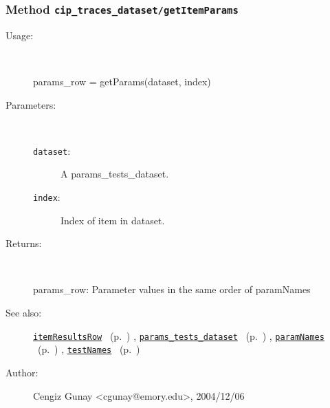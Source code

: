 \subsubsection[Method \texttt{getItemParams}]{Method \texttt{cip\_traces\_dataset/getItemParams}}%
%
\label{ref_cip_traces_dataset__getItemParams}%
\hypertarget{ref_cip_traces_dataset__getItemParams}{}%
\begin{description}
%
\item[Usage:]~%
\begin{lyxcode}%
params\_row = getParams(dataset, index)
%
\end{lyxcode}%
%
%
\item[Parameters:]~
\begin{description}%
\item[\texttt{dataset}:]
 A params\_tests\_dataset.
\item[\texttt{index}:]
 Index of item in dataset.
\end{description}%
%
\item[Returns:]~

	params\_row: Parameter values in the same order of paramNames
%
%
\item[See also:]%
\hyperlink{ref_itemResultsRow}{\texttt{itemResultsRow}}%
\ (p.~\pageref{ref_itemResultsRow})%
%
, \hyperlink{ref_params_tests_dataset}{\texttt{params\_tests\_dataset}}%
\ (p.~\pageref{ref_params_tests_dataset})%
%
, \hyperlink{ref_paramNames}{\texttt{paramNames}}%
\ (p.~\pageref{ref_paramNames})%
%
, \hyperlink{ref_testNames}{\texttt{testNames}}%
\ (p.~\pageref{ref_testNames})%
%
%
\item[Author:]%
Cengiz Gunay <cgunay@emory.edu>, 2004/12/06%
\end{description}
\methodline%
